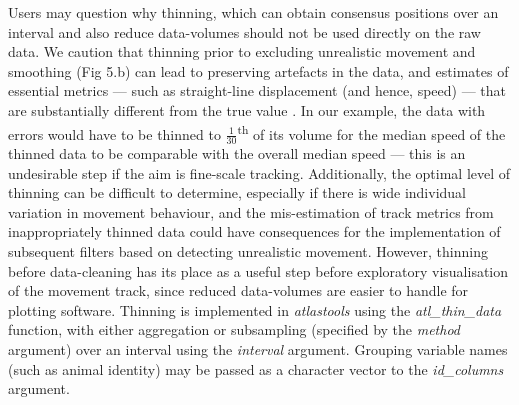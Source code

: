     Users may question why thinning, which can obtain consensus positions over an interval and also reduce data-volumes should not be used directly on the raw data.
    We caution that thinning prior to excluding unrealistic movement and smoothing (Fig 5.b) can lead to preserving artefacts in the data, and estimates of essential metrics --- such as straight-line displacement (and hence, speed) --- that are substantially different from the true value \citep[see Fig.~\ref{preproc_fig_05}.c;][]{noonan2019}.
    In our example, the data with errors would have to be thinned to $\frac{1}{30}$\textsuperscript{th} of its volume for the median speed of the thinned data to be comparable with the overall median speed --- this is an undesirable step if the aim is fine-scale tracking.
    Additionally, the optimal level of thinning can be difficult to determine, especially if there is wide individual variation in movement behaviour, and the mis-estimation of track metrics from inappropriately thinned data could have consequences for the implementation of subsequent filters based on detecting unrealistic movement.
    However, thinning before data-cleaning has its place as a useful step before exploratory visualisation of the movement track, since reduced data-volumes are easier to handle for plotting software.
    Thinning is implemented in \textit{atlastools} using the \textit{atl\_thin\_data} function, with either aggregation or subsampling (specified by the \textit{method} argument) over an interval using the \textit{interval} argument.
    Grouping variable names (such as animal identity) may be passed as a character vector to the \textit{id\_columns} argument.


